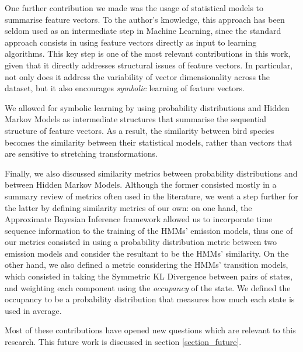 \documentclass[../main.tex]{subfiles}
\begin{document}
\par One further contribution we made was the usage of statistical models to summarise feature vectors. To the author's knowledge, this approach has been seldom used as an intermediate step in Machine Learning, since the standard approach consists in using feature vectors directly as input to learning algorithms. This key step is one of the most relevant contributions in this work, given that it directly addresses structural issues of feature vectors. In particular, not only does it address the variability of vector dimensionality across the dataset, but it also encourages \emph{symbolic} learning of feature vectors. 
\par We allowed for symbolic learning by using probability distributions and Hidden Markov Models as intermediate structures that summarise the sequential structure of feature vectors. As a result, the similarity between bird species becomes the similarity between their statistical models, rather than vectors that are sensitive to stretching transformations.
\par Finally, we also discussed similarity metrics between probability distributions and between Hidden Markov Models. Although the former consisted mostly in a summary review of metrics often used in the literature, we went a step further for the latter by defining similarity metrics of our own: on one hand, the Approximate Bayesian Inference framework allowed us to incorporate time sequence information to the training of the HMMs' emission models, thus one of our metrics consisted in using a probability distribution metric between two emission models and consider the resultant to be the HMMs' similarity. On the other hand, we also defined a metric considering the HMMs' transition models, which consisted in taking the Symmetric KL Divergence between pairs of states, and weighting each component using the \emph{occupancy} of the state. We defined the occupancy to be a probability distribution that measures how much each state is used in average.
\par Most of these contributions have opened new questions which are relevant to this research. This future work is discussed in section \ref{section_future}.
\end{document}
